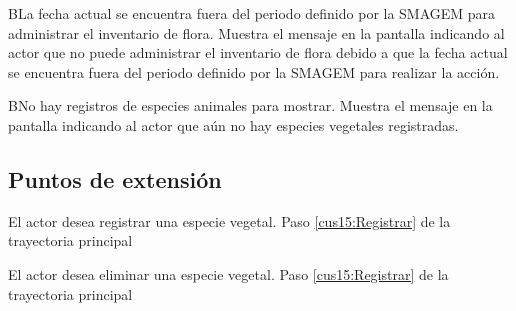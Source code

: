     \begin{UCtrayectoriaA}{B}{La fecha actual se encuentra fuera del periodo definido por la SMAGEM para administrar el inventario de flora.}
    \UCpaso[\UCsist] Muestra el mensaje  en la pantalla  indicando al actor que no puede administrar el inventario de flora debido a que la fecha actual se encuentra fuera del periodo definido por la SMAGEM para realizar la acción. 
 \end{UCtrayectoriaA}
 
  \begin{UCtrayectoriaA}{B}{No hay registros de especies animales para mostrar.}
    \UCpaso[\UCsist] Muestra el mensaje  en la pantalla  indicando al actor que aún no hay especies vegetales registradas. 
 \end{UCtrayectoriaA}


\subsection{Puntos de extensión}

\UCExtensionPoint
{El actor desea registrar una especie vegetal.}
{ Paso \ref{cus15:Registrar} de la trayectoria principal}
{}

\UCExtensionPoint
{El actor desea eliminar una especie vegetal.}
{ Paso \ref{cus15:Registrar} de la trayectoria principal}
{}
